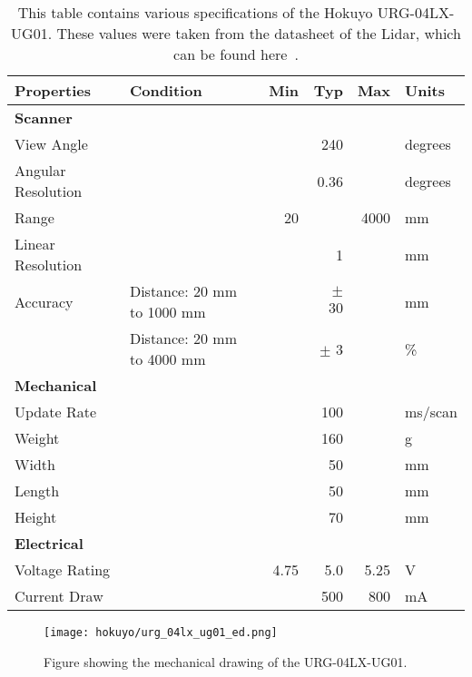 \begin{table}
\centering
\begin{tabulary}{\textwidth}{|l||l|r|r|r|l|}
\hline
\textbf{Properties}& \textbf{Condition}         & \textbf{Min} & \textbf{Typ} & \textbf{Max} & \textbf{Units} \\	\hline\hline
\textbf{Scanner}   &                            &              &              &              &                \\	\hline
View Angle 	       &                            &              & 240          &              & degrees        \\	\hline
Angular Resolution &                            &              & 0.36         &              & degrees        \\	\hline
Range 	           &                            & 20           &              & 4000         & mm             \\	\hline 
Linear Resolution  &                            &              & 1            &              & mm             \\	\hline 
Accuracy           & Distance: 20 mm to 1000 mm &              & $\pm$ 30     &              & mm             \\	\hline 
        	       & Distance: 20 mm to 4000 mm &              & $\pm$ 3      &              & \%             \\	\hline \hline 
\textbf{Mechanical}&                            &              &              &              &                \\	\hline
Update Rate	       &                            &              & 100          &              & ms/scan        \\	\hline 
Weight             &                            &              & 160          &              & g              \\	\hline 
Width              &                            &              & 50           &              & mm             \\	\hline 
Length             &                            &              & 50           &              & mm             \\	\hline 
Height             &                            &              & 70           &              & mm             \\	\hline \hline
\textbf{Electrical}&                            &              &              &              &                \\	\hline 
Voltage Rating     &                            & 4.75         & 5.0          & 5.25         & V              \\	\hline 
Current Draw       &                            &              & 500          & 800          & mA             \\	\hline 
\end{tabulary} 
\caption{This table contains various specifications of the Hokuyo URG-04LX-UG01.
         These values were taken from the datasheet of the Lidar, which can be found here~\cite{urg_specs}.}
\label{tab:lidar_params1}
\end{table}

\begin{figure}
\centering
\texttt{[image: hokuyo/urg\_04lx\_ug01\_ed.png]}
\caption{Figure showing the mechanical drawing of the URG-04LX-UG01.}
\label{fig:lidar_diagram1}
\end{figure}
